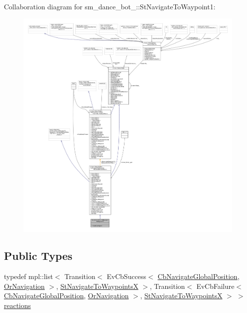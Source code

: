Collaboration diagram for sm\+\_\+dance\+\_\+bot\+\_\+:\+:St\+Navigate\+To\+Waypoint1\+:
\nopagebreak
\begin{figure}[H]
\begin{center}
\leavevmode
\includegraphics[width=350pt]{structsm__dance__bot__2_1_1StNavigateToWaypoint1__coll__graph}
\end{center}
\end{figure}
\subsection*{Public Types}
\begin{DoxyCompactItemize}
\item 
typedef mpl\+::list$<$ Transition$<$ Ev\+Cb\+Success$<$ \hyperlink{classcl__move__base__z_1_1CbNavigateGlobalPosition}{Cb\+Navigate\+Global\+Position}, \hyperlink{classsm__dance__bot__2_1_1OrNavigation}{Or\+Navigation} $>$, \hyperlink{structsm__dance__bot__2_1_1StNavigateToWaypointsX}{St\+Navigate\+To\+WaypointsX} $>$, Transition$<$ Ev\+Cb\+Failure$<$ \hyperlink{classcl__move__base__z_1_1CbNavigateGlobalPosition}{Cb\+Navigate\+Global\+Position}, \hyperlink{classsm__dance__bot__2_1_1OrNavigation}{Or\+Navigation} $>$, \hyperlink{structsm__dance__bot__2_1_1StNavigateToWaypointsX}{St\+Navigate\+To\+WaypointsX} $>$ $>$ \hyperlink{structsm__dance__bot__2_1_1StNavigateToWaypoint1_a8351842b595de4eb153c7b838360727d}{reactions}
\end{DoxyCompactItemize}
